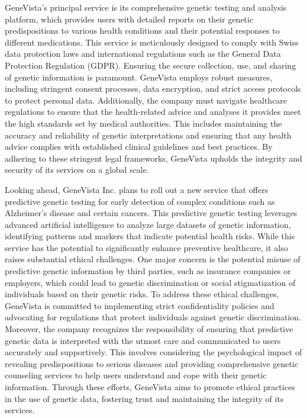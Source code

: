 \documentclass[a4paper]{article}
\begin{document}
GeneVista's principal service is its comprehensive genetic testing and analysis platform, which provides users with detailed reports on their genetic predispositions to various health conditions and their potential responses to different medications. This service is meticulously designed to comply with Swiss data protection laws and international regulations such as the General Data Protection Regulation (GDPR). Ensuring the secure collection, use, and sharing of genetic information is paramount. GeneVista employs robust measures, including stringent consent processes, data encryption, and strict access protocols to protect personal data. Additionally, the company must navigate healthcare regulations to ensure that the health-related advice and analyses it provides meet the high standards set by medical authorities. This includes maintaining the accuracy and reliability of genetic interpretations and ensuring that any health advice complies with established clinical guidelines and best practices. By adhering to these stringent legal frameworks, GeneVista upholds the integrity and security of its services on a global scale.

Looking ahead, GeneVista Inc. plans to roll out a new service that offers predictive genetic testing for early detection of complex conditions such as Alzheimer's disease and certain cancers. This predictive genetic testing leverages advanced artificial intelligence to analyze large datasets of genetic information, identifying patterns and markers that indicate potential health risks. While this service has the potential to significantly enhance preventive healthcare, it also raises substantial ethical challenges. One major concern is the potential misuse of predictive genetic information by third parties, such as insurance companies or employers, which could lead to genetic discrimination or social stigmatization of individuals based on their genetic risks. To address these ethical challenges, GeneVista is committed to implementing strict confidentiality policies and advocating for regulations that protect individuals against genetic discrimination. Moreover, the company recognizes the responsibility of ensuring that predictive genetic data is interpreted with the utmost care and communicated to users accurately and supportively. This involves considering the psychological impact of revealing predispositions to serious diseases and providing comprehensive genetic counseling services to help users understand and cope with their genetic information. Through these efforts, GeneVista aims to promote ethical practices in the use of genetic data, fostering trust and maintaining the integrity of its services.
\end{document}
